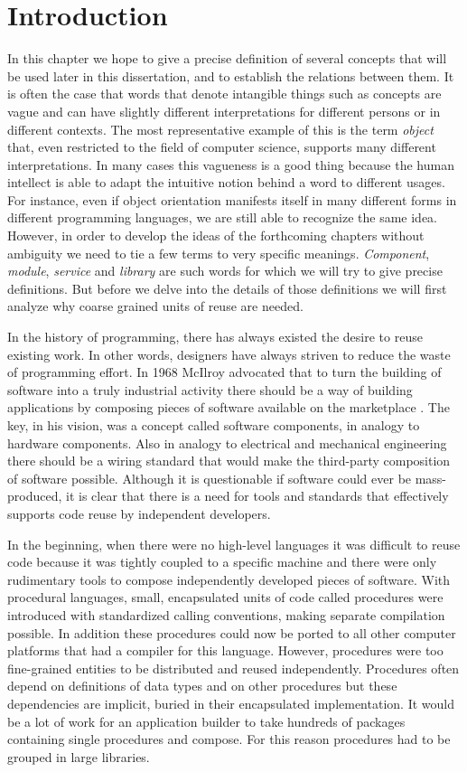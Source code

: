 \section{Introduction}

In this chapter we hope to give a precise definition of several concepts that will be used later in this dissertation, and to
establish the relations between them. It is often the case that words that denote intangible things such as concepts are vague
and can have slightly different interpretations for different persons or in different contexts. The most representative example
of this is the term \emph{object} that, even restricted to the field of computer science, supports many different interpretations.
In many cases this vagueness is a good thing because the human intellect is able to adapt the intuitive notion behind a word
to different usages. For instance, even if object orientation manifests itself in many different forms in different programming
languages, we are still able to recognize the same idea. However, in order to develop the ideas of the forthcoming chapters
without ambiguity we need to tie a few terms to very specific meanings. \emph{Component}, \emph{module}, \emph{service} and
\emph{library} are such words for which we will try to give precise definitions. But before we delve into the details of those
definitions we will first analyze why coarse grained units of reuse are needed.

In the history of programming, there has always existed the desire to reuse existing work. In other words, designers have always
striven to reduce the waste of programming effort. In 1968 McIlroy advocated that to turn the building of software into a truly
industrial activity there should be a way of building applications by composing pieces of software available on the marketplace
\cite{McIlroy}. The key, in his vision, was a concept called software components, in analogy to hardware components. Also in
analogy to electrical and mechanical engineering there should be a wiring standard that would make the third-party composition
of software possible. Although it is questionable if software could ever be mass-produced, it is clear that there is a need for
tools and standards that effectively supports code reuse by independent developers.

In the beginning, when there were no high-level languages it was difficult to reuse code because it was tightly coupled to a
specific machine and there were only rudimentary tools to compose independently developed pieces of software.
With procedural languages, small, encapsulated units of code called procedures were introduced with standardized calling
conventions, making separate compilation possible. In addition these procedures could now be ported to all other computer platforms
that had a compiler for this language. However, procedures were too fine-grained entities to be distributed and reused independently.
Procedures often depend on definitions of data types and on other procedures but these dependencies are implicit, buried in their
encapsulated implementation. It would be a lot of work for an application builder to take hundreds of packages containing single procedures and
compose. For this reason procedures had to be grouped in large libraries.

